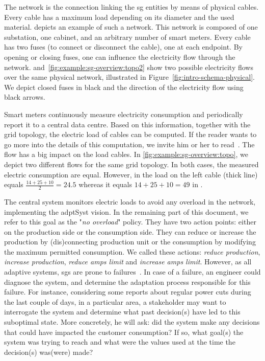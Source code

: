 The network is the connection linking the \gls{sg} entities by means of physical cables. 
Every cable has a maximum load depending on its diameter and the used material.
 depicts an example of such a network. 
This network is composed of one substation, one cabinet, and an arbitrary number of smart meters.
Every cable has two fuses (to connect or disconnect the cable), one at each endpoint.
By opening or closing fuses, one can influence the electricity flow through the network.
 and~\ref{fig:example:sg-overview:topo2} show two possible electricity flows over the same physical network, illustrated in Figure~\ref{fig:intro-schema-physical}. 
We depict closed fuses in black and the direction of the electricity flow using black arrows.

Smart meters continuously measure electricity consumption and periodically report it to a central data centre.
Based on this information, together with the grid topology, the electric load of cables can be computed.
If the reader wants to go more into the details of this computation, we invite him or her to read~\cite{DBLP:conf/sac/0001MFRKT16}.
The flow has a big impact on the load cables.
In \autoref{fig:example:sg-overview:topo}, we depict two different flows for the same grid topology.
In both cases, the measured electric consumption are equal.
However, in  the load on the left cable (thick line) equals $\frac{14 + 25 + 10}{2} = 24.5$ whereas it equals $14+25+10=49$ in .

The central system monitors electric loads to avoid any overload in the network, implementing the \gls{adptSyst} vision.
In the remaining part of this document, we refer to this goal as the "\textit{no overload}" policy.
They have two \gls{action} points: either on the production side or the consumption side.
They can reduce or increase the production by (dis)connecting production unit or the consumption by modifying the maximum permitted consumption.
We called these actions: \textit{reduce production}, \textit{increase production}, \textit{reduce amps limit} and \textit{increase amps limit}.
However, as all adaptive systems, \gls{sg}s are prone to failures~\cite{DBLP:conf/smartgridsec/0001FKNT14}.
In case of a failure, an engineer could diagnose the system, and determine the adaptation process responsible for this failure.
For instance, considering some reports about regular power cuts during the last couple of days, in a particular area, a stakeholder may want to interrogate the system and determine what past decision(s) have led to this suboptimal state.
More concretely, he will ask: did the system make any decisions that could have impacted the customer consumption? 
If so, what goal(s) the system was trying to reach and what were the values used at the time the decision(s) was(were) made?










